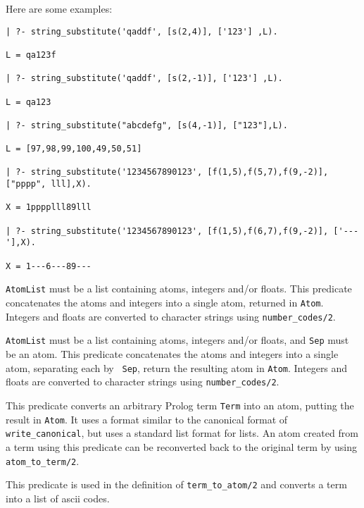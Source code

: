 \begin{description}
Here are some examples:
\begin{verbatim}
| ?- string_substitute('qaddf', [s(2,4)], ['123'] ,L).

L = qa123f

| ?- string_substitute('qaddf', [s(2,-1)], ['123'] ,L).

L = qa123

| ?- string_substitute("abcdefg", [s(4,-1)], ["123"],L).

L = [97,98,99,100,49,50,51]

| ?- string_substitute('1234567890123', [f(1,5),f(5,7),f(9,-2)], ["pppp", lll],X).

X = 1pppplll89lll

| ?- string_substitute('1234567890123', [f(1,5),f(6,7),f(9,-2)], ['---'],X).

X = 1---6---89---
\end{verbatim}


{\tt AtomList} must be a list containing atoms, integers and/or
floats.  This predicate concatenates the atoms and integers into a
single atom, returned in {\tt Atom}.  Integers and floats are
converted to character strings using {\tt number\_codes/2}.


{\tt AtomList} must be a list containing atoms, integers and/or
floats, and {\tt Sep} must be an atom.  This predicate concatenates
the atoms and integers into a single atom, separating each by {\tt
Sep}, return the resulting atom in {\tt Atom}.  Integers and floats
are converted to character strings using {\tt number\_codes/2}.


This predicate converts an arbitrary Prolog term {\tt Term} into an
atom, putting the result in {\tt Atom}.  It uses a format similar to
the canonical format of {\tt write\_canonical}, but uses a standard
list format for lists.  An atom created from a term using this
predicate can be reconverted back to the original term by using {\tt
atom\_to\_term/2}.


This predicate is used in the definition of {\tt term\_to\_atom/2} and 
converts a term into a list of ascii codes.


\end{description}
